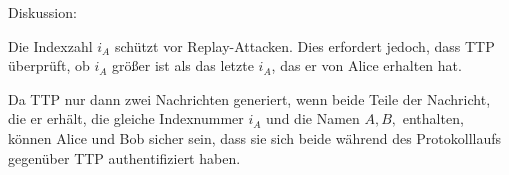 \documentclass[a4paper]{article}
\begin{document}
\begin{multicols}{3}
\begin{itemize*}
            \item Diskussion:
            \begin{itemize*}
                  \item Die Indexzahl $i_A$ schützt vor Replay-Attacken. Dies erfordert jedoch, dass TTP überprüft, ob $i_A$ größer ist als das letzte $i_A$, das er von Alice erhalten hat.
                  \item Da TTP nur dann zwei Nachrichten generiert, wenn beide Teile der Nachricht, die er erhält, die gleiche Indexnummer $i_A$ und die Namen $A, B,$ enthalten, können Alice und Bob sicher sein, dass sie sich beide während des Protokolllaufs gegenüber TTP authentifiziert haben.
            \end{itemize*}
      \end{itemize*}


\end{multicols}
\end{document}
